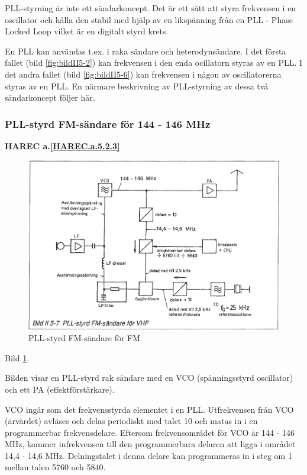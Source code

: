 PLL-styrning är inte ett sändarkoncept. Det är ett sätt att styra
frekvensen i en oscillator och hålla den stabil med hjälp av en
likspänning från en PLL - Phase Locked Loop vilket är en digitalt
styrd krets.

En PLL kan användas t.ex. i raka sändare och heterodynsändare. I det
första fallet (bild \ref{fig:bildII5-2}) kan frekvensen i den enda ocillatorn
styras av en PLL. I det andra fallet (bild \ref{fig:bildII5-6}) kan frekvensen i
någon av oscillatorerna styras av en PLL.  En närmare beskrivning av
PLL-styrning av dessa två sändarkoncept följer här.

\subsubsection{PLL-styrd FM-sändare för 144 - 146 MHz}
\textbf{
HAREC a.\ref{HAREC.a.5.2.3}\label{myHAREC.a.5.2.3}
}

\begin{figure}
  \includegraphics[width=\textwidth]{images/bild_2_5-07}
  \caption{PLL-styrd FM-sändare för FM}
  \label{fig:bildII5-7}
\end{figure}

Bild \ref{fig:bildII5-7}.

Bilden visar en PLL-styrd rak sändare med en VCO (spänningsstyrd
oscillator) och ett PA (effektförstärkare).

VCO ingår som det frekvensstyrda elementet i en PLL. Utfrekvensen från
VCO (ärvärdet) avläses och delas periodiskt med talet 10 och matas in
i en programmerbar frekvensdelare. Eftersom frekvensområdet för VCO är
144 - 146 MHz, kommer infrekvensen till den programmerbara delaren att
ligga i området 14,4 - 14,6 MHz. Delningstalet i denna delare kan
programmeras in i steg om 1 mellan talen 5760 och 5840.

